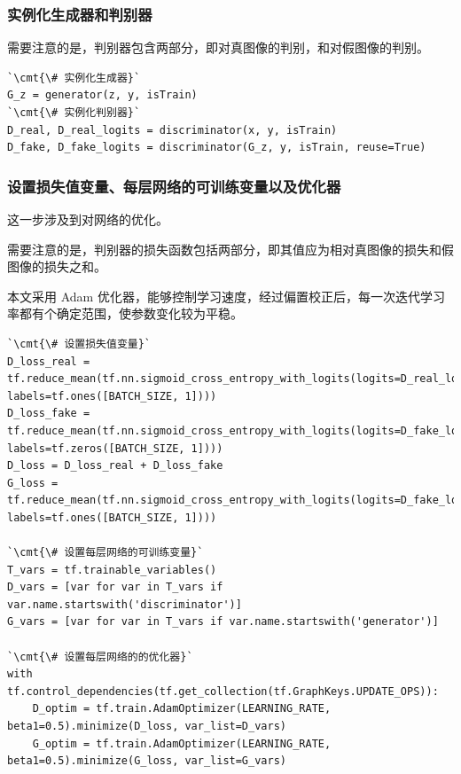 \documentclass[a4paper, 12pt]{article}
\begin{document}
\subsubsection{实例化生成器和判别器}

需要注意的是，判别器包含两部分，即对真图像的判别，和对假图像的判别。

\begin{lstlisting}[style=myPython,caption={实例化生成器和判别器}]
`\cmt{\# 实例化生成器}`
G_z = generator(z, y, isTrain)
`\cmt{\# 实例化判别器}`
D_real, D_real_logits = discriminator(x, y, isTrain)
D_fake, D_fake_logits = discriminator(G_z, y, isTrain, reuse=True)
\end{lstlisting}

\subsubsection{设置损失值变量、每层网络的可训练变量以及优化器}

这一步涉及到对网络的优化。

需要注意的是，判别器的损失函数包括两部分，即其值应为相对真图像的损失和假图像的损失之和。

本文采用 Adam 优化器，能够控制学习速度，经过偏置校正后，每一次迭代学习率都有个确定范围，使参数变化较为平稳。

\begin{lstlisting}[style=myPython,caption={设置损失值变量、每层网络的可训练变量以及优化器}]
`\cmt{\# 设置损失值变量}`
D_loss_real = tf.reduce_mean(tf.nn.sigmoid_cross_entropy_with_logits(logits=D_real_logits, labels=tf.ones([BATCH_SIZE, 1])))
D_loss_fake = tf.reduce_mean(tf.nn.sigmoid_cross_entropy_with_logits(logits=D_fake_logits, labels=tf.zeros([BATCH_SIZE, 1])))
D_loss = D_loss_real + D_loss_fake
G_loss = tf.reduce_mean(tf.nn.sigmoid_cross_entropy_with_logits(logits=D_fake_logits, labels=tf.ones([BATCH_SIZE, 1])))

`\cmt{\# 设置每层网络的可训练变量}`
T_vars = tf.trainable_variables()
D_vars = [var for var in T_vars if var.name.startswith('discriminator')]
G_vars = [var for var in T_vars if var.name.startswith('generator')]

`\cmt{\# 设置每层网络的的优化器}`
with tf.control_dependencies(tf.get_collection(tf.GraphKeys.UPDATE_OPS)):
    D_optim = tf.train.AdamOptimizer(LEARNING_RATE, beta1=0.5).minimize(D_loss, var_list=D_vars)
    G_optim = tf.train.AdamOptimizer(LEARNING_RATE, beta1=0.5).minimize(G_loss, var_list=G_vars)
\end{lstlisting}
\end{document}
